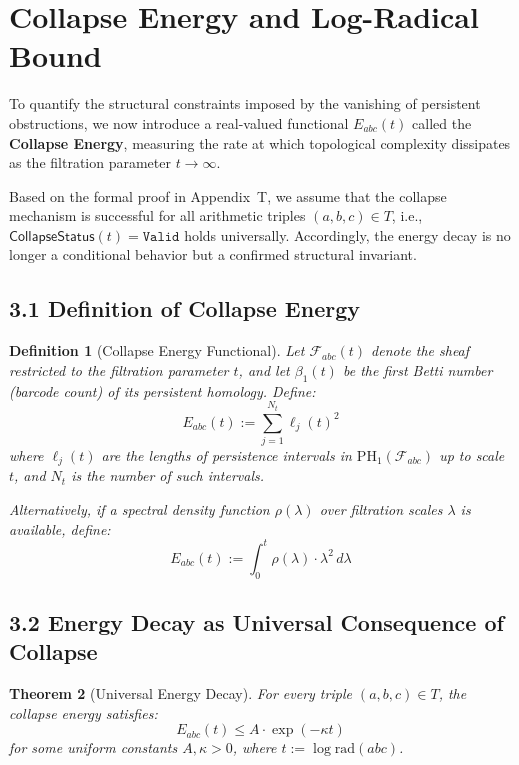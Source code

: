 \documentclass[11pt]{article}
\newtheorem{theorem}{Theorem}[section]
\newtheorem{definition}[theorem]{Definition}
\begin{document}
\section{Collapse Energy and Log-Radical Bound}

To quantify the structural constraints imposed by the vanishing of persistent obstructions, we now introduce a real-valued functional \( E_{abc}(t) \) called the \textbf{Collapse Energy}, measuring the rate at which topological complexity dissipates as the filtration parameter \( t \to \infty \).

Based on the formal proof in Appendix~T, we assume that the collapse mechanism is successful for all arithmetic triples \( (a,b,c) \in T \), i.e., \( \mathsf{CollapseStatus}(t) = \texttt{Valid} \) holds universally.  
Accordingly, the energy decay is no longer a conditional behavior but a confirmed structural invariant.

\subsection{3.1 Definition of Collapse Energy}

\begin{definition}[Collapse Energy Functional]
Let \( \mathcal{F}_{abc}(t) \) denote the sheaf restricted to the filtration parameter \( t \), and let \( \beta_1(t) \) be the first Betti number (barcode count) of its persistent homology. Define:
\[
E_{abc}(t) := \sum_{j=1}^{N_t} \ell_j(t)^2
\]
where \( \ell_j(t) \) are the lengths of persistence intervals in \( \mathrm{PH}_1(\mathcal{F}_{abc}) \) up to scale \( t \), and \( N_t \) is the number of such intervals.

Alternatively, if a spectral density function \( \rho(\lambda) \) over filtration scales \( \lambda \) is available, define:
\[
E_{abc}(t) := \int_0^t \rho(\lambda) \cdot \lambda^2 \, d\lambda
\]
\end{definition}

\subsection{3.2 Energy Decay as Universal Consequence of Collapse}

\begin{theorem}[Universal Energy Decay]
For every triple \( (a,b,c) \in T \), the collapse energy satisfies:
\[
E_{abc}(t) \leq A \cdot \exp(-\kappa t)
\]
for some uniform constants \( A, \kappa > 0 \), where \( t := \log \mathrm{rad}(abc) \).
\end{theorem}
\end{document}
